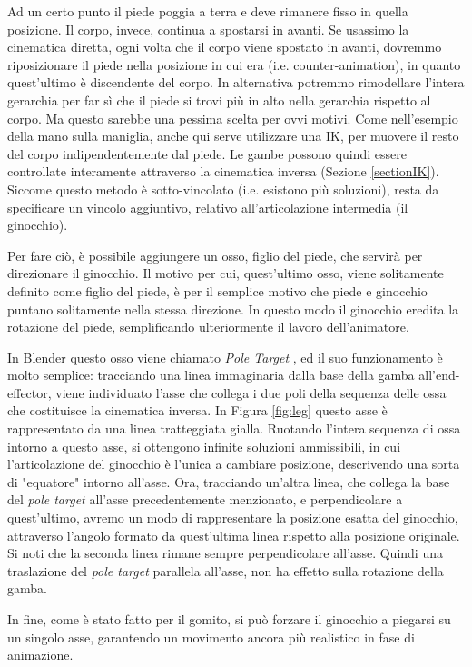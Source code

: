 Ad un certo punto il piede poggia a terra e deve rimanere fisso in quella posizione. Il corpo, invece, continua a spostarsi in avanti.
Se usassimo la cinematica diretta, ogni volta che il corpo viene spostato in avanti, dovremmo riposizionare il piede nella posizione in cui era (i.e. counter-animation), in quanto quest'ultimo è discendente del corpo.
In alternativa potremmo rimodellare l'intera gerarchia per far sì che il piede si trovi più in alto nella gerarchia rispetto al corpo. Ma questo sarebbe una pessima scelta per ovvi motivi.
Come nell'esempio della mano sulla maniglia, anche qui serve utilizzare una IK, per muovere il resto del corpo indipendentemente dal piede.
Le gambe possono quindi essere controllate interamente attraverso la cinematica inversa (Sezione \ref{sectionIK}).
Siccome questo metodo è sotto-vincolato (i.e. esistono più soluzioni), resta da specificare un vincolo aggiuntivo, relativo all'articolazione intermedia (il ginocchio).

Per fare ciò, è possibile aggiungere un osso, figlio del piede, che servirà per direzionare il ginocchio.
Il motivo per cui, quest'ultimo osso, viene solitamente definito come figlio del piede, è per il semplice motivo che piede e ginocchio puntano solitamente nella stessa direzione.
In questo modo il ginocchio eredita la rotazione del piede, semplificando ulteriormente il lavoro dell'animatore.

In Blender questo osso viene chiamato \emph{Pole Target} \cite{blendDoc}, ed il suo funzionamento è molto semplice: tracciando una linea immaginaria dalla base della gamba all'end-effector, viene individuato l'asse che collega i due poli della sequenza delle ossa che costituisce la cinematica inversa.
In Figura \ref{fig:leg} questo asse è rappresentato da una linea tratteggiata gialla.
Ruotando l'intera sequenza di ossa intorno a questo asse, si ottengono infinite soluzioni ammissibili, in cui l'articolazione del ginocchio è l'unica a cambiare posizione, descrivendo una sorta di "equatore" intorno all'asse.
Ora, tracciando un'altra linea, che collega la base del \emph{pole target} all'asse precedentemente menzionato, e perpendicolare a quest'ultimo, avremo un modo di rappresentare la posizione esatta del ginocchio, attraverso l'angolo formato da quest'ultima linea rispetto alla posizione originale.
Si noti che la seconda linea rimane sempre perpendicolare all'asse. Quindi una traslazione del \emph{pole target} parallela all'asse, non ha effetto sulla rotazione della gamba.

In fine, come è stato fatto per il gomito, si può forzare il ginocchio a piegarsi su un singolo asse, garantendo un movimento ancora più realistico in fase di animazione.


